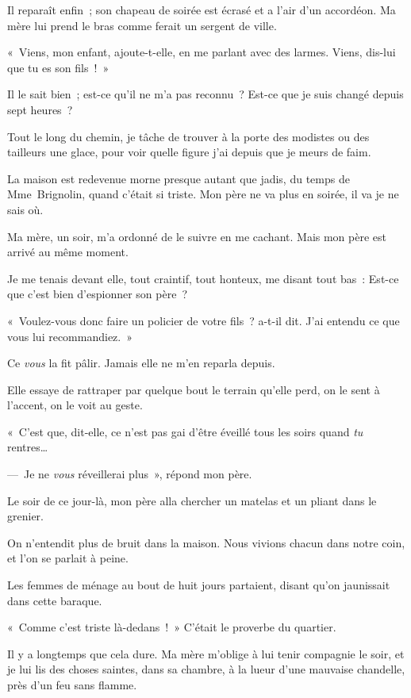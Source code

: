 \documentclass[french,twoside]{book} %
\def\mednobreak{\ifdim\lastskip<\medskipamount
  \removelastskip\nopagebreak\medskip\fi}
\newcommand{\labelblock}[1]{\medbreak{\noindent\color{rubric}\bfseries #1}\par\mednobreak}
\begin{document}
Il reparaît enfin ; son chapeau de soirée est écrasé et a l’air d’un accordéon. Ma mère lui prend le bras comme ferait un sergent de ville.\par
« Viens, mon enfant, ajoute-t-elle, en me parlant avec des larmes. Viens, dis-lui que tu es son fils ! »\par
Il le sait bien ; est-ce qu’il ne m’a pas reconnu ? Est-ce que je suis changé depuis sept heures ?\par
Tout le long du chemin, je tâche de trouver à la porte des modistes ou des tailleurs une glace, pour voir quelle figure j’ai depuis que je meurs de faim.\par

\labelblock{TU, VOUS}

\noindent La maison est redevenue morne presque autant que jadis, du temps de Mme Brignolin, quand c’était si triste. Mon père ne va plus en soirée, il va je ne sais où.\par
Ma mère, un soir, m’a ordonné de le suivre en me cachant. Mais mon père est arrivé au même moment.\par
Je me tenais devant elle, tout craintif, tout honteux, me disant tout bas : Est-ce que c’est bien d’espionner son père ?\par
« Voulez-vous donc faire un policier de votre fils ? a-t-il dit. J’ai entendu ce que vous lui recommandiez. »\par
Ce \emph{vous} la fit pâlir. Jamais elle ne m’en reparla depuis.\par
Elle essaye de rattraper par quelque bout le terrain qu’elle perd, on le sent à l’accent, on le voit au geste.\par
« C’est que, dit-elle, ce n’est pas gai d’être éveillé tous les soirs quand\emph{ tu} rentres…\par
— Je ne \emph{vous} réveillerai plus », répond mon père.\par
Le soir de ce jour-là, mon père alla chercher un matelas et un pliant dans le grenier.\par
\bigbreak
\noindent On n’entendit plus de bruit dans la maison. Nous vivions chacun dans notre coin, et l’on se parlait à peine.\par
Les femmes de ménage au bout de huit jours partaient, disant qu’on jaunissait dans cette baraque.\par
« Comme c’est triste là-dedans ! » C’était le proverbe du quartier.\par
\bigbreak
\noindent Il y a longtemps que cela dure. Ma mère m’oblige à lui tenir compagnie le soir, et je lui lis des choses saintes, dans sa chambre, à la lueur d’une mauvaise chandelle, près d’un feu sans flamme.\par
\end{document}

